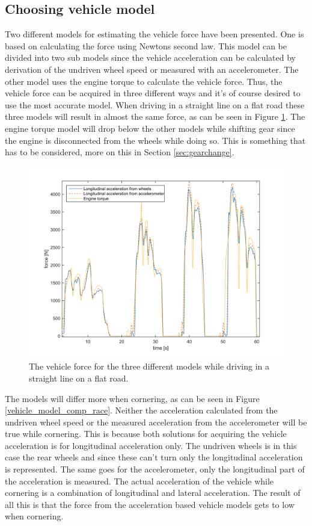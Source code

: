 \subsection{Choosing vehicle model}
Two different models for estimating the vehicle force have been presented. One is based on calculating the force using Newtons second law. This model can be divided into two sub models since the vehicle acceleration can be calculated by derivation of the undriven wheel speed or measured with an accelerometer. The other model uses the engine torque to calculate the vehicle force. Thus, the vehicle force can be acquired in three different ways and it's of course desired to use the most accurate model. When driving in a straight line on a flat road these three models will result in almost the same force, as can be seen in Figure \ref{vehicle_model_comp_olikaacc}. The engine torque model will drop below the other models while shifting gear since the engine is disconnected from the wheels while doing so. This is something that has to be considered, more on this in Section \ref{sec:gearchange}.

\begin{figure}[h]
	\centering
	\includegraphics[width=1\textwidth]{Pictures/vehicle_model_comp_olikaacc}
	\caption{The vehicle force for the three different models while driving in a straight line on a flat road.}
	\label{vehicle_model_comp_olikaacc}
\end{figure}

The models will differ more when cornering, as can be seen in Figure \ref{vehicle_model_comp_race}. Neither the acceleration calculated from the undriven wheel speed or the measured acceleration from the accelerometer will be true while cornering. This is because both solutions for acquiring the vehicle acceleration is for longitudinal acceleration only. The undriven wheels is in this case the rear wheels and since these can't turn only the longitudinal acceleration is represented. The same goes for the accelerometer, only the longitudinal part of the acceleration is measured. The actual acceleration of the vehicle while cornering is a combination of longitudinal and lateral acceleration. The result of all this is that the force from the acceleration based vehicle models gets to low when cornering. 

